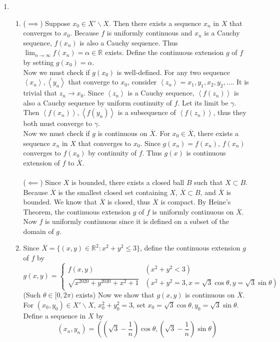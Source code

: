 \documentclass[11pt]{report}
\renewcommand{\span}[1]{\left\langle #1 \right\rangle}
\newcommand{\ra}{\rightarrow}
\newcommand{\bs}{\backslash}
\newcommand{\mimp}{$\implies$}
\newcommand{\R}{\mathbb{R}}
\begin{document}
\begin{enumerate}
\item
\begin{enumerate}
	\item (\mimp) Suppose $x_0 \in X'\bs X$. Then there exists a sequence $x_n$ in $X$ that converges to $x_0$. Because $f$ is uniformly continuous and $x_n$ is a Cauchy sequence, $f(x_n)$ is also a Cauchy sequence. Thus $\lim_{n\ra\infty} f(x_n) = \alpha \in \R$ exists.  Define the continuous extension $g$ of $f$ by setting $g(x_0) = \alpha$.\\
	Now we must check if $g(x_0)$ is well-defined. For any two sequence $\span{x_n}, \span{y_n}$ that converge to $x_0$, consider $\span{z_n} = x_1, y_1, x_2, y_2, \dots$. It is trivial that $z_n\ra x_0$. Since $\span{z_n}$ is a Cauchy sequence, $\span{f(z_n)}$ is also a Cauchy sequence by uniform continuity of $f$. Let its limit be $\gamma$. Then $\span{f(x_n)}, \span{f(y_n)}$ is a subsequence of $\span{f(z_n)}$, thus they both must converge to $\gamma$.\\
	Now we must check if $g$ is continuous on $\overline{X}$. For $x_0\in \overline{X}$, there exists a sequence $x_n$ in $X$ that converges to $x_0$. Since $g(x_n) = f(x_n)$, $f(x_n)$ converges to $f(x_0)$ by continuity of $f$. Thus $g(x)$ is continuous extension of $f$ to $\overline{X}$.\\
	\\
	($\impliedby$) Since $X$ is bounded, there exists a closed ball $B$ such that $X\subset B$. Because $\overline{X}$ is the smallest closed set containing $X$, $\overline{X} \subset B$, and $\overline{X}$ is bounded. We know that $\overline{X}$ is closed, thus $\overline{X}$ is compact. By Heine's Theorem, the continuous extension $g$ of $f$ is uniformly continuous on $\overline{X}$. Now $f$ is uniformly continuous since it is defined on a subset of the domain of $g$.
	\item Since $\overline{X} = \{(x, y)\in \R^2: x^2+y^2\leq 3 \}$, define the continuous extension $g$ of $f$ by $$g(x, y) = \begin{cases}
		f(x, y) & (x^2+y^2 < 3)\\
		\sqrt{x^{2020} + y^{2020} + x^2 +1} & (x^2 + y^2 = 3, x = \sqrt{3}\cos\theta, y = \sqrt{3}\sin\theta)
	\end{cases}$$
	(Such $\theta \in [0, 2\pi)$ exists) Now we show that $g(x, y)$ is continuous on $\overline{X}$. For $(x_0, y_0)\in X'\bs X$, $x_0^2 + y_0^2 = 3$, set $x_0 = \sqrt{3}\cos\theta, y_0 = \sqrt{3}\sin\theta$. Define a sequence in $X$ by $$(x_n, y_n) = \left(\left(\sqrt{3} - \frac{1}{n}\right)\cos\theta, \left(\sqrt{3} - \frac{1}{n}\right)\sin\theta \right)$$

\end{enumerate}
\end{enumerate}
\end{document}
